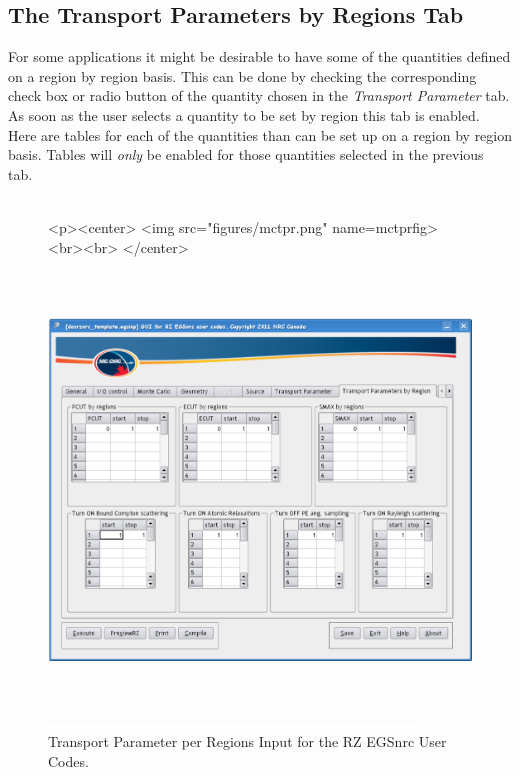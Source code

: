 \documentclass[12pt,twoside]{article}   %
\begin{document}
\newpage
\subsection{The Transport Parameters by Regions Tab}

For some applications it might be desirable to have some of the quantities defined on a region by 
region basis. This can be done by checking the corresponding check box or radio button of the quantity
chosen in the {\em Transport Parameter} tab. As soon as the user selects a quantity to be set by region 
this tab is enabled. Here are tables for each of the quantities than can be set up on a region by region 
basis. Tables will {\em only} be enabled for those quantities selected in the previous tab. \\ \\

\begin{figure}[htb]
\begin{htmlonly}
\begin{rawhtml}
<p><center>
<img src="figures/mctpr.png" name=mctprfig><br><br>
</center>
\end{rawhtml}
\end{htmlonly}
\begin{latexonly}
\begin{center}
\includegraphics[height=11.56cm]{figures/mctpr}
\end{center}
\end{latexonly}
\begin{center}
\includegraphics[height=1mm]{figures/fake2}
\end{center}
\caption{Transport Parameter per Regions Input for the RZ EGSnrc User Codes.}
\label{mctprfig}
\end{figure}
\end{document}
